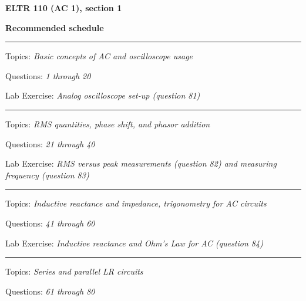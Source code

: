 
\centerline{\bf ELTR 110 (AC 1), section 1} \bigskip 
 
\vskip 10pt

\noindent
{\bf Recommended schedule}

\vskip 5pt

\hrule \vskip 5pt
\noindent
{}

\hskip 10pt Topics: {\it Basic concepts of AC and oscilloscope usage}
 
\hskip 10pt Questions: {\it 1 through 20}
 
\hskip 10pt Lab Exercise: {\it Analog oscilloscope set-up (question 81)}
 


\vskip 10pt
\hrule \vskip 5pt
\noindent
{}

\hskip 10pt Topics: {\it RMS quantities, phase shift, and phasor addition}
 
\hskip 10pt Questions: {\it 21 through 40}
 
\hskip 10pt Lab Exercise: {\it RMS versus peak measurements (question 82) and measuring frequency (question 83)}
 


\vskip 10pt
\hrule \vskip 5pt
\noindent
{}

\hskip 10pt Topics: {\it Inductive reactance and impedance, trigonometry for AC circuits}
 
\hskip 10pt Questions: {\it 41 through 60}
 
\hskip 10pt Lab Exercise: {\it Inductive reactance and Ohm's Law for AC (question 84)}
 

\vskip 10pt
\hrule \vskip 5pt
\noindent
{}

\hskip 10pt Topics: {\it Series and parallel LR circuits}
 
\hskip 10pt Questions: {\it 61 through 80}
 

